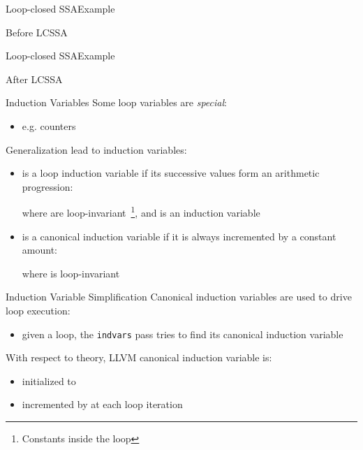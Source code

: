 \documentclass[10pt,mathserif]{beamer}
\begin{document}
\begin{frame}{Loop-closed SSA}{Example}
\begin{block}{Before LCSSA}
\centering
{}
\end{block}
\vspace{\baselineskip}
\vfill
\end{frame}

\begin{frame}{Loop-closed SSA}{Example}
\begin{block}{After LCSSA}
\centering
{}
\end{block}
\vfill
\end{frame}

\begin{frame}{Induction Variables}
Some loop variables are \emph{special}:

\begin{itemize}
\item e.g. counters
\end{itemize}

\vfill
Generalization lead to \alert{induction variables}:

\begin{itemize}
\item {} is a loop induction variable if its successive values form
      an arithmetic progression:

      \begin{center}
      \end{center}

      where  are
      loop-invariant~\footnote{Constants inside the loop}, and  is
      an induction variable
\item {} is a \alert{canonical} induction variable if it is always
      incremented by a constant amount:

      \begin{center}
      \end{center}

      where  is loop-invariant
\end{itemize}
\end{frame}

\begin{frame}{Induction Variable Simplification}
Canonical induction variables are used to \alert{drive} loop execution:

\begin{itemize}
\item given a loop, the \texttt{indvars} pass tries to find its canonical
      induction variable
\end{itemize}

\vfill
With respect to theory, LLVM canonical induction variable is:

\begin{itemize}
\item initialized to 
\item incremented by  at each loop iteration
\end{itemize}
\end{frame}
\end{document}
